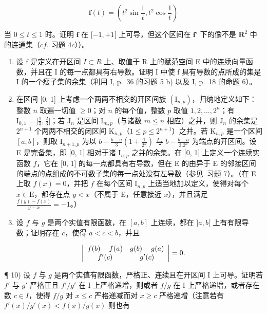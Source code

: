 \[
\mathbf {f} (t) = \left(t ^ {2} \sin \frac {1}{t}, t ^ {2} \cos \frac {1}{t}\right)
\]

当 \(0 \leqslant t \leqslant 1\) 时。证明 \(\mathbf{f}\) 在 \([-1, +1[\) 上可导，但这个区间在 \(\mathbf{f}'\) 下的像不是 \(\mathbf{R}^2\) 中的连通集（\(cf.\) 习题 \(4c\)））。

\begin{enumerate}
\def\labelenumi{\arabic{enumi})}
\setcounter{enumi}{6}
\item
  设 f 是定义在开区间 \(I \subset R\) 上、取值于 R 上的赋范空间 E 中的连续向量函数，并且在 I 的每一点都具有右导数。证明 I 中使 f 具有导数的点所成的集是 I 的一个瘦子集的余集（利用 I, p.~36 的习题 5 b) 以及 I, p.~18 的命题 6）。
\item
  在区间 {[}0, 1{]} 上考虑一个两两不相交的开区间族 \((\mathrm{I}_{n,p})\)，归纳地定义如下：整数 \(n\) 取遍一切值 \(\geqslant 0\)；对 \(n\) 的每个值，整数 \(p\) 取值 \(1,2,\ldots ,2^n\)；有 \(\mathrm{I}_{0,1} = ]\frac{1}{3},\frac{2}{3}[\)；若 \(\mathrm{J}_n\) 是区间 \(\mathrm{I}_{m,p}\)（与诸数 \(m\leqslant n\) 相应）之并，则 \(\mathrm{J}_n\) 的余集是 \(2^{n + 1}\) 个两两不相交的闭区间 \(\mathrm{K}_{n,p}\)（\(1\leqslant p\leqslant 2^{n + 1}\)）之并。若 \(\mathrm{K}_{n,p}\) 是一个区间 \([a,b]\)，则取 \(\mathrm{I}_{n + 1,p}\) 为以 \(b - \frac{b - a}{3}\left(1 + \frac{1}{2^n}\right)\) 与 \(b - \frac{b - a}{3.2^n}\) 为端点的开区间。设 E 是完备集，即 {[}0, 1{]} 相对于诸 \(\mathrm{I}_{n,p}\) 之并的余集。在 {[}0, 1{]} 上定义一个连续实函数 \(f\)，它在 {[}0, 1{]} 的每一点都具有右导数，但在 E 的由异于 E 的邻接区间的端点的点组成的不可数子集的每一点处没有左导数（参见~习题 7）。（在 E 上取 \(f(x) = 0\)，并把 \(f\) 在每个区间 \(\mathrm{I}_{n,p}\) 上适当地加以定义，使得对每个 \(x\in \mathrm{E}\)，都存在点 \(y < x\)（不属于 E，任意接近 \(x\)），并且满足 \(\frac{f(y) - f(x)}{y - x} = -1\)。）
\item
  设 \(f\) 与 \(g\) 是两个实值有限函数，在 \([a, b]\) 上连续，都在 \(]a, b[\) 上有有限导数；证明存在 \(c\)，使得 \(a < c < b\)，并且
\end{enumerate}

\[
\left| \begin{array}{c c} f (b) - f (a) & g (b) - g (a) \\ f ^ {\prime} (c) & g ^ {\prime} (c) \end{array} \right| = 0.
\]

¶ 10) 设 \(f\) 与 \(g\) 是两个实值有限函数，严格正、连续且在开区间 I 上可导。证明若 \(f'\) 与 \(g'\) 严格正且 \(f'/g'\) 在 I 上严格递增，则或者 \(f/g\) 在 I 上严格递增，或者存在数 \(c \in I\)，使得 \(f / g\) 对 \(x \leqslant c\) 严格递减而对 \(x \geqslant c\) 严格递增（注意若有 \(f'(x) / g'(x) < f(x) / g(x)\) 则也有

